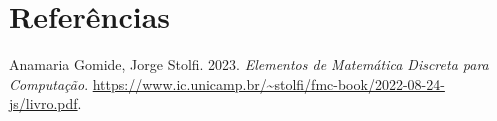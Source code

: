 \documentclass[
  letterpaper,
  DIV=11,
  numbers=noendperiod]{scrreprt}
\newlength{\cslhangindent}
\newenvironment{CSLReferences}[2] %
 {\begin{list}{}{%
  \setlength{\itemindent}{0pt}
  \setlength{\leftmargin}{0pt}
  \setlength{\parsep}{0pt}
  \ifodd #1
   \setlength{\leftmargin}{\cslhangindent}
   \setlength{\itemindent}{-1\cslhangindent}
  \fi
  \setlength{\itemsep}{#2\baselineskip}}}
 {\end{list}}
\begin{document}

\chapter*{Referências}\label{referuxeancias}


\label{refs}
\begin{CSLReferences}{1}{0}
Anamaria Gomide, Jorge Stolfi. 2023. \emph{Elementos de Matemática
Discreta para Computação}.
\url{https://www.ic.unicamp.br/~stolfi/fmc-book/2022-08-24-js/livro.pdf}.

\end{CSLReferences}
\end{document}
